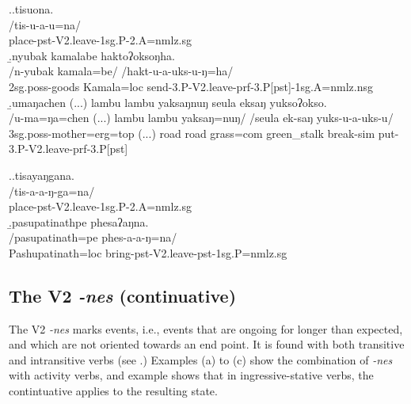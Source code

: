 \ex.\a.\glll tisuona.\\
 /tis-u-a-u=na/\\
 place{\sc -pst-V2.leave-1sg.P-2.A=nmlz.sg}\\
 \b.\glll nyubak kamalabe haktoʔoksoŋha.\\
 /n-yubak kamala=be/ /hakt-u-a-uks-u-ŋ=ha/\\
 {\sc 2sg.poss-}goods Kamala{\sc =loc} send{\sc -3.P-V2.leave-prf-3.P[pst]-1sg.A=nmlz.nsg}\\
 \b.\glll umaŋachen (...) lambu lambu yaksaŋnuŋ seula               eksaŋ         yuksoʔokso.\\
 /u-ma=ŋa=chen (...) lambu lambu yaksaŋ=nuŋ/ /seula               ek-saŋ         yuks-u-a-uks-u/\\
{\sc 3sg.poss-}mother{\sc =erg=top} (...) road road  grass{\sc =com} green\_stalk break{\sc -sim} put{\sc -3.P-V2.leave-prf-3.P[pst]}\\
   
 
 
 \ex.\a.\glll tisayaŋgana.\\
 /tis-a-a-ŋ-ga=na/\\
 place{\sc -pst-V2.leave-1sg.P-2.A=nmlz.sg}\\
 \b.\glll pasupatinathpe phesaʔaŋna.\\
 /pasupatinath=pe phes-a-a-ŋ=na/\\
Pashupatinath{\sc =loc} bring{\sc -pst-V2.leave-pst-1sg.P=nmlz.sg}\\



\subsection{The V2 \emph{-nes}  (continuative)}\label{V2-lay}%
\largerpage
The V2 \emph{-nes}  marks  events, i.e., events that are ongoing for longer than expected, and which are not oriented towards an end point. It is found with both transitive and intransitive verbs (see \Next.) Examples (a) to (c) show the combination of \emph{-nes} with activity verbs,  and example \Next[d] shows that in ingressive-stative verbs, the contintuative applies to the resulting state.
 
